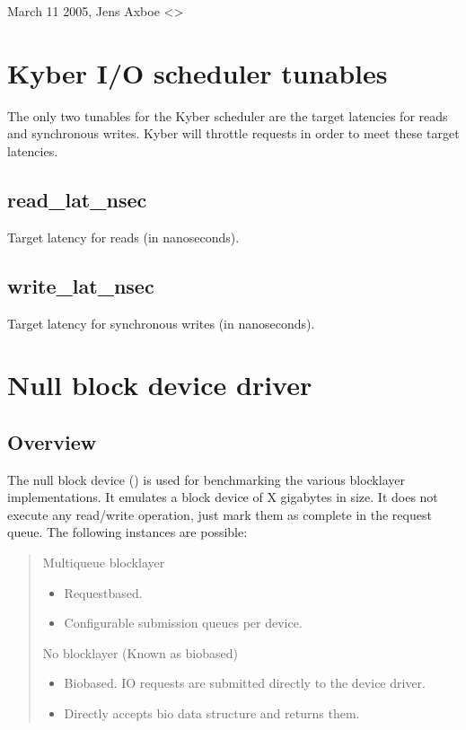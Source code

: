 \documentclass[a4paper,11pt,english]{sphinxmanual}
\begin{document}
March 11 2005, Jens Axboe \textless{}\textgreater{}


\chapter{Kyber I/O scheduler tunables}
\label{\detokenize{kyber-iosched:kyber-i-o-scheduler-tunables}}\label{\detokenize{kyber-iosched::doc}}
The only two tunables for the Kyber scheduler are the target latencies for
reads and synchronous writes. Kyber will throttle requests in order to meet
these target latencies.


\section{read\_lat\_nsec}
\label{\detokenize{kyber-iosched:read-lat-nsec}}
Target latency for reads (in nanoseconds).


\section{write\_lat\_nsec}
\label{\detokenize{kyber-iosched:write-lat-nsec}}
Target latency for synchronous writes (in nanoseconds).


\chapter{Null block device driver}
\label{\detokenize{null_blk:null-block-device-driver}}\label{\detokenize{null_blk::doc}}

\section{Overview}
\label{\detokenize{null_blk:overview}}
The null block device () is used for benchmarking the various
block\sphinxhyphen{}layer implementations. It emulates a block device of X gigabytes in size.
It does not execute any read/write operation, just mark them as complete in
the request queue. The following instances are possible:
\begin{quote}

Multi\sphinxhyphen{}queue block\sphinxhyphen{}layer
\begin{itemize}
\item {} 
Request\sphinxhyphen{}based.

\item {} 
Configurable submission queues per device.

\end{itemize}

No block\sphinxhyphen{}layer (Known as bio\sphinxhyphen{}based)
\begin{itemize}
\item {} 
Bio\sphinxhyphen{}based. IO requests are submitted directly to the device driver.

\item {} 
Directly accepts bio data structure and returns them.

\end{itemize}
\end{quote}
\end{document}
